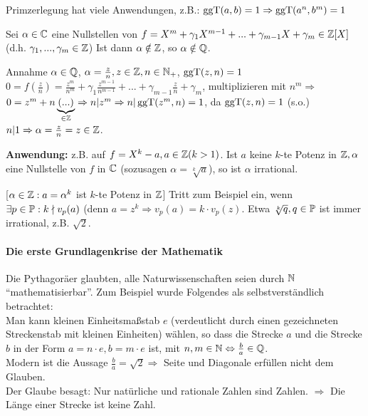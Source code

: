 \documentclass[a4paper,twoside,DIV15,BCOR12mm]{scrbook}
\begin{document}
Primzerlegung hat viele Anwendungen, z.B.: $\mathop{\rm ggT}\nolimits(a,b) = 1
\Rightarrow \mathop{\rm ggT}\nolimits(a^n, b^m) = 1$

\begin{satz}[Irrationalitätskriterium]
Sei $\alpha \in \mathbb{C}$ eine Nullstellen von $f = X^m + \gamma_1
X^{m-1} + ... + \gamma_{m-1}X + \gamma_m \in \mathbb{Z}[X]$ (d.h.
$\gamma_1,...,\gamma_m \in \mathbb{Z}$) Ist dann $\alpha \notin \mathbb{Z}$, so
$\alpha \notin \mathbb{Q}$.
\end{satz}

\begin{beweis}
Annahme $\alpha \in \mathbb{Q}$, $\alpha = \frac{z}{n}, z \in \mathbb{Z}, n \in \mathbb{N}_+$, $\mathop{\rm ggT}\nolimits(z, n) = 1$\\
$0 = f(\frac{z}{n}) = \frac{z^m}{n^m} + \gamma_1\frac{z^{m-1}}{n^{m-1}} + ... + \gamma_{m-1}\frac{z}{n} + \gamma_m$, multiplizieren mit $n^m \Rightarrow$\\
$0 = z^m + n\underbrace{(...)}_{\in \mathbb{Z}} \Rightarrow n|z^m \Rightarrow n|\mathop{\rm ggT}\nolimits(z^m, n) = 1$, da $\mathop{\rm ggT}\nolimits(z, n) = 1$ (s.o.)\\
$n|1 \Rightarrow \alpha = \frac{z}{n} = z\in \mathbb{Z}$.
\end{beweis}

\textbf{Anwendung:} z.B. auf $f = X^k - a, a \in \mathbb{Z} (k > 1)$. Ist
$a$ keine $k$-te Potenz in $\mathbb{Z}, \alpha$ eine Nullstelle von $f$ in
$\mathbb{C}$ (sozusagen $\alpha = \sqrt[k]{a}$), so ist $\alpha$
irrational.

[$\alpha \in \mathbb{Z}: a = \alpha^k$ ist $k$-te Potenz in $\mathbb{Z}$] Tritt
zum Beispiel ein, wenn $\exists p \in \mathbb{P}: k \nmid v_p(a)$ (denn $a
= z^k \Rightarrow v_p(a) = k \cdot v_p(z)$. Etwa $\sqrt[k]{q}, q \in
\mathbb{P}$ ist immer irrational, z.B. $\sqrt{2}$.

\paragraph{Die erste Grundlagenkrise der Mathematik}
Die Pythagoräer glaubten, alle Naturwissenschaften seien durch $\mathbb{N}$ "`mathematisierbar"'. Zum Beispiel wurde Folgendes als selbstverständlich betrachtet:\\
Man kann kleinen Einheitsmaßstab $e$ (verdeutlicht durch einen gezeichneten Streckenstab mit kleinen Einheiten) wählen, so dass die Strecke $a$ und die Strecke $b$ in der Form $a = n \cdot e, b = m \cdot e$ ist, mit $n, m \in \mathbb{N} \Leftrightarrow \frac{b}{a} \in \mathbb{Q}$.\\
Modern ist die Aussage $\frac{b}{a} = \sqrt{2} \Rightarrow $ Seite und Diagonale erfüllen nicht dem Glauben.\\
Der Glaube besagt: Nur natürliche und rationale Zahlen sind Zahlen.
$\Rightarrow$ Die Länge einer Strecke ist keine Zahl.
\end{document}
